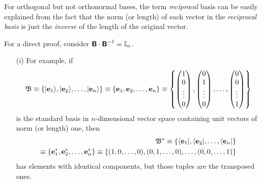 For orthogonal but not orthonormal bases, the term {\em reciprocal} basis
can be easily explained from the fact that the norm (or length) of each vector in the {\em reciprocal basis}
is just the {\em inverse} of the length of the original vector.

{\color{OliveGreen}
\bproof
For a direct proof, consider $\textsf{\textbf{B}}\cdot \textsf{\textbf{B}}^{-1} ={\Bbb I}_n$.
\eproof
}


{\color{blue}
\bexample
\begin{itemize}
\item[(i)]
For example,
if
\begin{equation}
{\frak B}
\equiv
\{ \vert {\bf e}_1 \rangle ,\vert  {\bf e}_2\rangle ,\ldots ,\vert {\bf e}_n\rangle  \}
\equiv
\{{\bf e}_1, {\bf e}_2,\ldots ,{\bf e}_n\}
\equiv
\left\{
\begin{pmatrix}
1\\
0\\
\vdots \\
0
\end{pmatrix}
,
\begin{pmatrix}
0\\
1\\
\vdots \\
0
\end{pmatrix}
,
\ldots ,
\begin{pmatrix}
0\\
0\\
\vdots \\
1
\end{pmatrix}
\right\}
\end{equation}
is the standard basis in $n$-dimensional vector space containing unit vectors of norm (or length) one,
then
\begin{equation}
\begin{split}
{\frak B}^\ast
\equiv
\{ \langle {\bf e}_1 \vert , \langle {\bf e}_2 \vert , \ldots ,\langle {\bf e}_n \vert \}
\\
\equiv
\{{\bf e}_1^\ast  ,{\bf e}_2^\ast , \ldots ,{\bf e}_n^\ast  \}
\equiv
\left\{
(1,0,\ldots,0),
(0,1,\ldots,0),
\ldots,
(0,0,\ldots,1)
\right\}
\end{split}
\end{equation}
has elements with identical components,
but those tuples are the transposed ones.


\end{itemize}}
